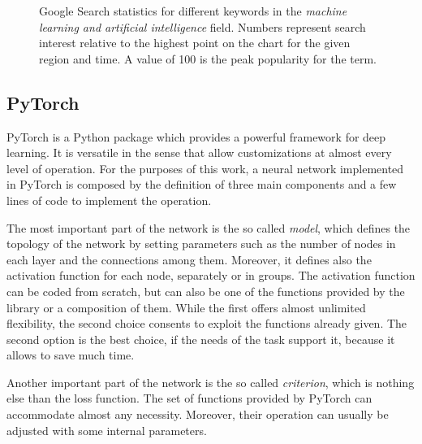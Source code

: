 \begin{figure}[htbp]
	\centering
	
	\caption{Google Search statistics for different keywords in the \textit{machine learning and artificial intelligence} field.
		Numbers represent search interest relative to the highest point on the chart for the given region and time.
		A value of 100 is the peak popularity for the term.}
	\label{fig:GoogleTrendsPyTorch}
\end{figure}


\subsection{PyTorch}
\label{ssec:PyTorch}
PyTorch is a Python package which provides a powerful framework for deep learning.
It is versatile in the sense that allow customizations at almost every level of operation.
For the purposes of this work, a neural network implemented in PyTorch is composed by the definition of three main components and a few lines of code to implement the operation.

The most important part of the network is the so called \textit{model}, which defines the topology of the network by setting parameters such as the number of nodes in each layer and the connections among them.
Moreover, it defines also the activation function for each node, separately or in groups.
The activation function can be coded from scratch, but can also be one of the functions provided by the library or a composition of them.
While the first offers almost unlimited flexibility, the second choice consents to exploit the functions already given.
The second option is the best choice, if the needs of the task support it, because it allows to save much time.

Another important part of the network is the so called \textit{criterion}, which is nothing else than the loss function.
The set of functions provided by PyTorch can accommodate almost any necessity.
Moreover, their operation can usually be adjusted with some internal parameters.

